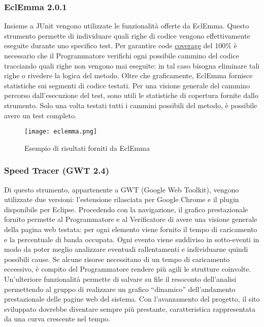 \documentclass[a4paper,11pt]{article}
\begin{document}
\subsubsection{EclEmma 2.0.1}
Insieme a JUnit vengono utilizzate le funzionalit\`a offerte da EclEmma. Questo strumento permette di individuare quali righe di codice vengono effettivamente
eseguite durante uno specifico test. Per garantire code \underline{coverage} del 100\% \`e necessario che il Programmatore verifichi ogni possibile cammino del codice tracciando quali righe
non vengono mai eseguite: in tal caso bisogna eliminare tali righe o rivedere la logica del metodo. Oltre che graficamente, EclEmma fornisce statistiche sui segmenti di codice testati.
Per una visione generale del cammino percorso dall'esecuzione del test, sono utili le statistiche di copertura fornite dallo strumento.
Solo una volta testati tutti i cammini possibili del metodo, \`e possibile avere un test completo.

\begin{figure}[h!]
\begin{center}
\texttt{[image: eclemma.png]}
\end{center}
\caption{Esempio di risultati forniti da EclEmma}
\end{figure}

\subsubsection{Speed Tracer (GWT 2.4)}
Di questo strumento, appartenente a GWT (Google Web Toolkit), vengono utilizzate due versioni: l'estensione rilasciata per Google Chrome e il plugin disponibile per Eclipse. Procedendo con la navigazione,
il grafico prestazionale fornito permette al Programmatore e al Verificatore di avere una visione generale della pagina web testata: per ogni elemento viene fornito il tempo di caricamento
e la percentuale di banda occupata. Ogni evento viene suddiviso in sotto-eventi in modo da poter meglio analizzare eventuali rallentamenti e individuarne quindi possibili cause.
Se alcune risorse necessitano di un tempo di caricamento eccessivo, \`e compito del Programmatore rendere pi\`u agili le strutture coinvolte. Un'ulteriore funzionalit\`a permette
di salvare su file il resoconto dell'analisi permettendo al gruppo di realizzare un grafico ``dinamico'' dell'andamento prestazionale delle pagine web del sistema.
Con l'avanzamento del progetto, il sito sviluppato dovrebbe diventare sempre pi\`u prestante, caratteristica rappresentata da una curva crescente nel tempo. 
\end{document}
